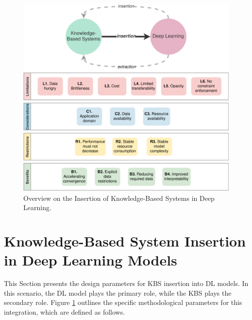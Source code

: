 \begin{figure}[t]
    \centering
    \includegraphics[width=\linewidth]{4_kbsintegrationdl/figures/overview_kbs_dl_intro.eps}
    \caption{Overview on the Insertion of Knowledge-Based Systems in Deep Learning.}
    \label{fig:overview_kbs_dl_intro}
\end{figure}

\section{Knowledge-Based System Insertion in Deep Learning Models} \label{4_sec:methodology_kbs_intro_dl}
This Section presents the design parameters for KBS insertion into DL models. In this scenario, the DL model plays the primary role, while the KBS plays the secondary role. Figure \ref{fig:overview_kbs_dl_intro} outlines the specific methodological parameters for this integration, which are defined as follows.

